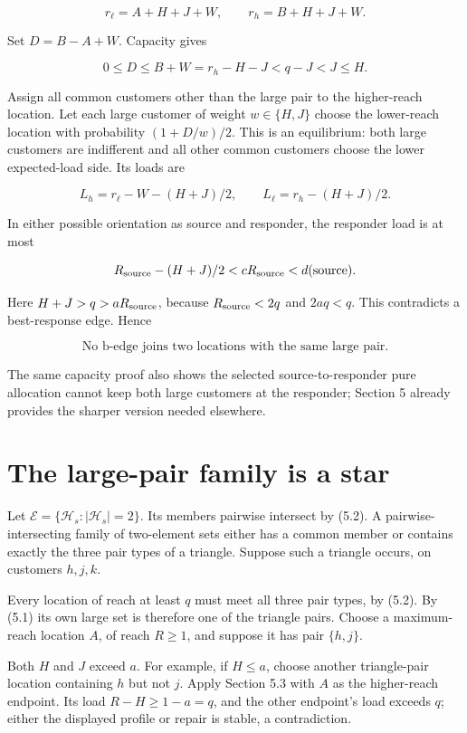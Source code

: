\documentclass[11pt,a4paper]{article}
\begin{document}
\[
r_\ell=A+H+J+W,\qquad r_h=B+H+J+W.
\]

Set \(D=B-A+W\). Capacity gives

\[
0\le D\le B+W=r_h-H-J<q-J<J\le H.
\]

Assign all common customers other than the large pair to the higher-reach location. Let each large customer of weight \(w\in\{H,J\}\) choose the lower-reach location with probability \((1+D/w)/2\). This is an equilibrium: both large customers are indifferent and all other common customers choose the lower expected-load side. Its loads are

\[
L_h=r_\ell-W-(H+J)/2,\qquad L_\ell=r_h-(H+J)/2.
\]

In either possible orientation as source and responder, the responder load is at most

\[
R_{\rm source}-(H+J)/2<cR_{\rm source}<d({\rm source}).
\]

Here \(H+J>q>aR_{\rm source}\), because \(R_{\rm source}<2q\) and \(2aq<q\). This contradicts a best-response edge. Hence

\[
\boxed{\text{No b-edge joins two locations with the same large pair.}} \tag{7.1}
\]

The same capacity proof also shows the selected source-to-responder pure allocation cannot keep both large customers at the responder; Section 5 already provides the sharper version needed elsewhere.

\hypertarget{the-large-pair-family-is-a-star}{%
\section{The large-pair family is a star}\label{the-large-pair-family-is-a-star}}

Let \(\mathcal E=\{\mathcal H_s:|\mathcal H_s|=2\}\). Its members pairwise intersect by (5.2). A pairwise-intersecting family of two-element sets either has a common member or contains exactly the three pair types of a triangle. Suppose such a triangle occurs, on customers \(h,j,k\).

Every location of reach at least \(q\) must meet all three pair types, by (5.2). By (5.1) its own large set is therefore one of the triangle pairs. Choose a maximum-reach location \(A\), of reach \(R\ge1\), and suppose it has pair \(\{h,j\}\).

Both \(H\) and \(J\) exceed \(a\). For example, if \(H\le a\), choose another triangle-pair location containing \(h\) but not \(j\). Apply Section 5.3 with \(A\) as the higher-reach endpoint. Its load \(R-H\ge1-a=q\), and the other endpoint's load exceeds \(q\); either the displayed profile or repair is stable, a contradiction.
\end{document}
